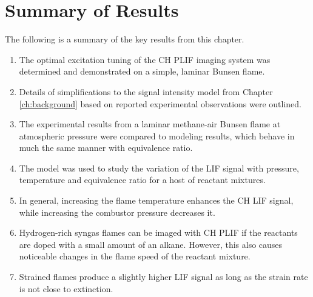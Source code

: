 
\section{Summary of Results}

The following is a summary of the key results from this chapter.

\begin{enumerate}
  \item The optimal excitation tuning of the CH PLIF imaging system was determined and demonstrated on a simple, laminar Bunsen flame.
  \item Details of simplifications to the signal intensity model from Chapter \ref{ch:background} based on reported experimental observations were outlined.
  \item The experimental results from a laminar methane-air Bunsen flame at atmospheric pressure were compared to modeling results, which behave in much the same manner with equivalence ratio.
  \item The model was used to study the variation of the LIF signal with pressure, temperature and equivalence ratio for a host of reactant mixtures.
  \item In general, increasing the flame temperature enhances the CH LIF signal, while increasing the combustor pressure decreases it.
  \item Hydrogen-rich syngas flames can be imaged with CH PLIF if the reactants are doped with a small amount of an alkane.
    However, this also causes noticeable changes in the flame speed of the reactant mixture.
  \item Strained flames produce a slightly higher LIF signal as long as the strain rate is not close to extinction.
\end{enumerate}

